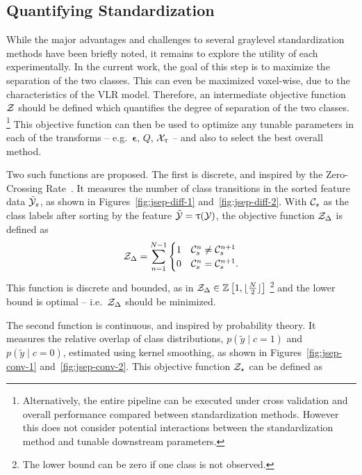 \subsection{Quantifying Standardization}
While the major advantages and challenges to several graylevel standardization methods
have been briefly noted, it remains to explore the utility of each experimentally.
In the current work, the goal of this step is to maximize the separation of the two classes.
This can even be maximized voxel-wise, due to the characteristics of the VLR model.
Therefore, an intermediate objective function $\mathcal{Z}$ should be defined
which quantifies the degree of separation of the two classes.%
\footnote{Alternatively, the entire pipeline can be executed under cross validation
  and overall performance compared between standardization methods.
However this does not consider potential interactions
between the standardization method and tunable downstream parameters.}
This objective function can then be used to optimize
any tunable parameters in each of the transforms
-- e.g.\ $\bm{\epsilon}$, $Q$, $\mathcal{X}_{\uptau}$ --
and also to select the best overall method.
\par
Two such functions are proposed.
The first is discrete, and inspired by the Zero-Crossing Rate~\cite{Kedem1986}.
It measures the number of class transitions in the sorted feature data $\tilde{\mathcal{Y}}_s$,
as shown in Figures~\ref{fig:jsep-diff-1} and~\ref{fig:jsep-diff-2}.
With $\mathcal{C}_s$ as the class labels after sorting by the feature $\tilde{\mathcal{Y}} = \uptau(\mathcal{Y})$,
the objective function $\mathcal{Z}_{\Delta}$ is defined as
\begin{equation}
  \Z_{\Delta} = \sum_{n=1}^{N-1}
     \begin{cases}
      1 & \C_s^{n} \ne \C_s^{n+1}\\
      0 & \C_s^{n}  =  \C_s^{n+1}.
    \end{cases}%
    \label{eq:zsep-diff}
\end{equation}
This function is discrete and bounded, as in
$\mathcal{Z}_{\Delta}\in\mathbb{Z}\left[1,\lfloor\frac{N}{2}\rfloor\right]$%
\footnote{The lower bound can be zero if one class is not observed.}
and the lower bound is optimal -- i.e.\ $\mathcal{Z}_{\Delta}$ should be minimized.
\par
The second function is continuous, and inspired by probability theory.
It measures the relative overlap of class distributions,
$p(\tilde{y}\mid c=1)$ and $p(\tilde{y}\mid c=0)$,
estimated using kernel smoothing,
as shown in Figures~\ref{fig:jsep-conv-1} and~\ref{fig:jsep-conv-2}.
This objective function $\mathcal{Z}_{\star}$ can be defined as
